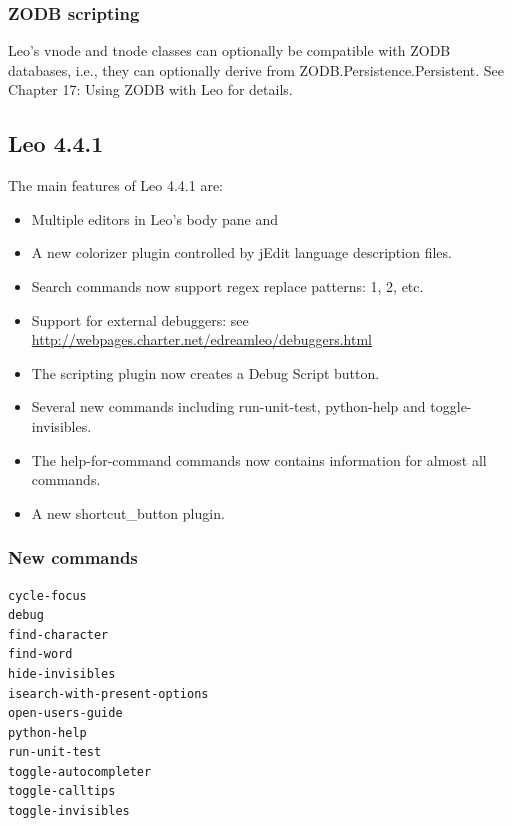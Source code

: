 \documentclass[a4paper,10pt,english]{sphinxmanual}
\begin{document}
\subsubsection{ZODB scripting}
\label{what-is-new:zodb-scripting}
Leo's vnode and tnode classes can optionally be compatible with ZODB databases,
i.e., they can optionally derive from ZODB.Persistence.Persistent.
See Chapter 17: Using ZODB with Leo for details.


\subsection{Leo 4.4.1}
\label{what-is-new:leo-4-4-1}
The main features of Leo 4.4.1 are:
\begin{itemize}
\item {} 
Multiple editors in Leo's body pane and

\item {} 
A new colorizer plugin controlled by jEdit language description files.

\item {} 
Search commands now support regex replace patterns: 1, 2, etc.

\item {} 
Support for external debuggers: see \href{http://webpages.charter.net/edreamleo/debuggers.html}{http://webpages.charter.net/edreamleo/debuggers.html}

\item {} 
The scripting plugin now creates a Debug Script button.

\item {} 
Several new commands including run-unit-test, python-help and toggle-invisibles.

\item {} 
The help-for-command commands now contains information for almost all commands.

\item {} 
A new shortcut\_button plugin.

\end{itemize}


\subsubsection{New commands}
\label{what-is-new:id22}
\begin{Verbatim}[commandchars=\\\{\}]
cycle-focus
debug
find-character
find-word
hide-invisibles
isearch-with-present-options
open-users-guide
python-help
run-unit-test
toggle-autocompleter
toggle-calltips
toggle-invisibles
\end{Verbatim}
\end{document}
